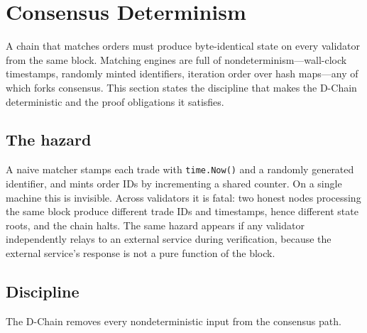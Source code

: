 \section{Consensus Determinism}
\label{sec:determinism}

A chain that matches orders must produce byte-identical state on every validator from
the same block. Matching engines are full of nondeterminism---wall-clock timestamps,
randomly minted identifiers, iteration order over hash maps---any of which forks
consensus. This section states the discipline that makes the D-Chain deterministic and
the proof obligations it satisfies.

\subsection{The hazard}

A naive matcher stamps each trade with \texttt{time.Now()} and a randomly generated
identifier, and mints order IDs by incrementing a shared counter. On a single machine
this is invisible. Across validators it is fatal: two honest nodes processing the same
block produce different trade IDs and timestamps, hence different state roots, and the
chain halts. The same hazard appears if any validator independently relays to an external
service during verification, because the external service's response is not a pure
function of the block.

\subsection{Discipline}

The D-Chain removes every nondeterministic input from the consensus path.

